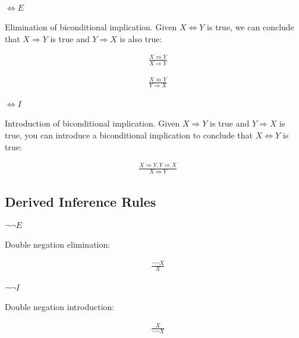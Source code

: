 \documentclass{article}
\begin{document}
\begin{multicols}{2}
  \paragraph{$\Leftrightarrow E$} Elimination of biconditional implication. Given $X \Leftrightarrow Y$ is true, we can conclude that $X \Rightarrow Y$ is true and $Y \Rightarrow X$ is also true:
  
  \begin{multicols}{2}
  \begin{align*}
   &\frac{X \Leftrightarrow Y}{X \Rightarrow Y}
  \end{align*}
  
  \break
  
  \begin{align*}
   &\frac{X \Leftrightarrow Y}{Y \Rightarrow X}
  \end{align*}
  \end{multicols}
  
  \paragraph{$\Leftrightarrow I$} Introduction of biconditional implication. Given $X \Rightarrow Y$ is true and $Y \Rightarrow X$ is true, you can introduce a biconditional implication to conclude that $X \Leftrightarrow Y$ is true:
  
  \begin{align*}
   &\frac{X \Rightarrow Y, Y \Rightarrow X}{X \Leftrightarrow Y}
  \end{align*}  
  
  \subsection{Derived Inference Rules}
  
  \paragraph{$\lnot \lnot E$} Double negation elimination:
  
  \begin{align*}
   &\frac{\lnot \lnot X}{X}
  \end{align*}  
  
  \paragraph{$\lnot \lnot I$} Double negation introduction:
  
  \begin{align*}
   &\frac{X}{\lnot \lnot X}
  \end{align*}  
  

\end{multicols}
\end{document}
